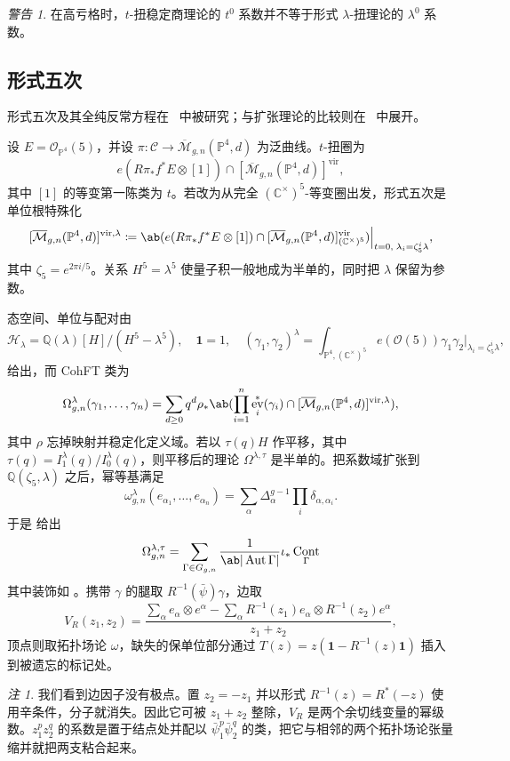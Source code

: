 \documentclass{amsart}
\theoremstyle{definition}
\theoremstyle{remark}
\newtheorem{rmk}[thm]{注}
\newtheorem{warn}[thm]{警告}
\theoremstyle{plain}
\theoremstyle{definition}
\theoremstyle{remark}
\newcommand{\C}{\mathbb{C}}
\newcommand{\Q}{\mathbb{Q}}
\renewcommand{\P}{\mathbb{P}}
\newcommand{\Mbar}{\overline{\mathcal{M}}}
\newcommand{\mc}[1]{\mathcal{#1}}
\newcommand{\mr}[1]{\mathrm{#1}}
\newcommand{\1}{\mathbf{1}}
\newcommand{\2}{\mathbf{2}}
\newcommand{\3}{\mathbf{3}}
\newcommand{\vir}{\mr{vir}}
\DeclareMathOperator{\Aut}{Aut}
\DeclareMathOperator{\ev}{ev}
\DeclareMathOperator{\Cont}{Cont}
\begin{document}
\begin{warn}
    在高亏格时，\(t\)-扭稳定商理论的 \(t^0\) 系数并不等于形式 \(\lambda\)-扭理论的 \(\lambda^0\) 系数。
\end{warn}

\subsection{形式五次}%
\label{sub:The formal quintic}

形式五次及其全纯反常方程在~\cite{LhoPandharipande2019} 中被研究；与扩张理论的比较则在~\cite{GJRstructure} 中展开。

设 \(E = \mc{O}_{\P^4}(5)\)，并设 \(\pi \colon \mc{C} \to \Mbar_{g,n}(\P^4,d)\) 为泛曲线。\(t\)-扭圈为
\[ e(R\pi_* f^* E \otimes [1]) \cap [\Mbar_{g,n}(\P^4,d)]^{\vir}, \]
其中 \([1]\) 的等变第一陈类为 \(t\)。若改为从完全 \((\C^{\times})^5\)-等变圈出发，形式五次是单位根特殊化
\[ [\Mbar_{g,n}(\P^4,d)]^{\vir,\lambda} \coloneqq \ab( e(R\pi_*f^*E \otimes [1]) \cap [\Mbar_{g,n}(\P^4,d)]^{\vir}_{(\C^{\times})^5})\Big|_{t=0, \; \lambda_i = \zeta_5^i \lambda}, \]
其中 \(\zeta_5 = e^{2\pi i/5}\)。关系 \(H^5 = \lambda^5\) 使量子积一般地成为半单的，同时把 \(\lambda\) 保留为参数。

态空间、单位与配对由
\[ \mc{H}_{\lambda} = \Q(\lambda)[H]/(H^5-\lambda^5), \quad \1 = 1, \quad (\gamma_1,\gamma_2)^{\lambda} = \int_{\P^4, (\C^{\times})^5} e(\mc{O}(5))\gamma_1\gamma_2 \Big|_{\lambda_i = \zeta_5^i\lambda}, \]
给出，而 CohFT 类为
\[ \Omega^{\lambda}_{g,n}(\gamma_1, \ldots, \gamma_n) = \sum_{d \geq 0} q^d \rho_* \ab( \prod_{i=1}^n \ev_i^*(\gamma_i) \cap [\Mbar_{g,n}(\P^4,d)]^{\vir,\lambda}), \]
其中 \(\rho\) 忘掉映射并稳定化定义域。若以 \(\tau(q)H\) 作平移，其中 \(\tau(q) = I^{\lambda}_1(q)/I^{\lambda}_0(q)\)，则平移后的理论 \(\Omega^{\lambda,\tau}\) 是半单的。把系数域扩张到 \(\Q(\zeta_5,\lambda)\) 之后，幂等基满足
\[ \omega^{\lambda}_{g,n}(e_{\alpha_1}, \ldots, e_{\alpha_n}) = \sum_{\alpha}\Delta_{\alpha}^{g-1}\prod_i \delta_{\alpha,\alpha_i}. \]
于是  给出
\[ \Omega^{\lambda,\tau}_{g,n} = \sum_{\Gamma \in G_{g,n}} \frac{1}{\ab|\Aut\Gamma|}\iota_* \Cont_{\Gamma} \]
其中装饰如 。携带 \(\gamma\) 的腿取 \(R^{-1}(\bar{\psi})\gamma\)，边取
\[ V_R(z_1,z_2) = \frac{\sum_{\alpha} e_{\alpha}\otimes e^{\alpha} - \sum_{\alpha} R^{-1}(z_1)e_{\alpha} \otimes R^{-1}(z_2)e^{\alpha}}{z_1+z_2}, \]
顶点则取拓扑场论 \(\omega\)，缺失的保单位部分通过 \(T(z) = z(\1 - R^{-1}(z)\1)\) 插入到被遗忘的标记处。

\begin{rmk}
    我们看到边因子没有极点。置 \(z_2 = -z_1\) 并以形式 \(R^{-1}(z) = R^*(-z)\) 使用辛条件，分子就消失。因此它可被 \(z_1+z_2\) 整除，\(V_R\) 是两个余切线变量的幂级数。\(z_1^p z_2^q\) 的系数是置于结点处并配以 \(\bar{\psi}_1^p \bar{\psi}_2^q\) 的类，把它与相邻的两个拓扑场论张量缩并就把两支粘合起来。
\end{rmk}
\end{document}
